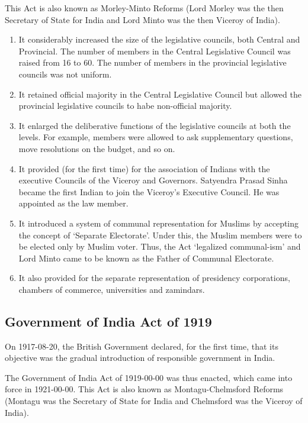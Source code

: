 \begin{multicols}{2}
This Act is also known as Morley-Minto Reforms (Lord Morley was the then Secretary of State for India and Lord Minto was the then Viceroy of India).
\begin{enumerate}
  \item It considerably increased the size of the legislative councils, both Central and Provincial. The number of members in the Central Legislative Council was raised from 16 to 60. The number of members in the provincial legislative councils was not uniform.
  \item It retained official majority in the Central Legislative Council but allowed the provincial legislative councils to habe non-official majority.
  \item It enlarged the deliberative functions of the legislative councils at both the levels. For example, members were allowed to ask supplementary questions, move resolutions on the budget, and so on.
  \item It provided (for the first time) for the association of Indians with the executive Councils of the Viceroy and Governors. Satyendra Prasad Sinha became the first Indian to join the Viceroy's Executive Council. He was appointed as the law member.
  \item It introduced a system of communal representation for Muslims by accepting the concept of `Separate Electorate'. Under this, the Muslim members were to be elected only by Muslim voter. Thus, the Act `legalized communal-ism' and Lord Minto came to be known as the Father of Communal Electorate.
  \item It also provided for the separate representation of presidency corporations, chambers of commerce, universities and zamindars.
\end{enumerate}

\subsection{Government of India Act of 1919}

On 1917-08-20, the British Government declared, for the first time, that its objective was the gradual introduction of responsible government in India\endnote.

The Government of India Act of 1919-00-00 was thus enacted, which came into force in 1921-00-00. This Act is also known as Montagu-Chelmsford Reforms (Montagu was the Secretary of State for India and Chelmsford was the Viceroy of India).


\end{multicols}
